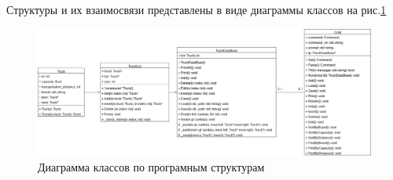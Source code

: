 Структуры и их взаимосвязи представлены
в виде диаграммы классов на рис.\ref{class_diagram}

\begin{figure}[htp!]
    \centering
    \includegraphics[width=0.9\linewidth]{photo/class_diagram}
    \caption{Диаграмма классов по програмным структурам}
    \label{class_diagram}
\end{figure}